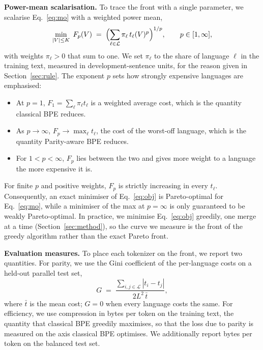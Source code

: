 \noindent\textbf{Power-mean scalarisation.}
To trace the front with a single parameter, we scalarise Eq.~\eqref{eq:mo} with a weighted
power mean,
\begin{equation}
  \min_{|V|\le K}\; F_p(V) \;=\;
  \Bigl(\sum_{\ell\in\mathcal{L}} \pi_\ell\, t_\ell(V)^{p}\Bigr)^{1/p},
  \qquad p\in[1,\infty],
  \label{eq:obj}
\end{equation}
with weights $\pi_\ell>0$ that sum to one. We set $\pi_\ell$ to the share of language $\ell$
in the training text, measured in development-sentence units, for the reason given in
Section~\ref{sec:rule}. The exponent $p$ sets how strongly expensive
languages are emphasised:
\begin{itemize}
  \item At $p=1$, $F_1=\sum_\ell \pi_\ell t_\ell$ is a weighted average cost, which is the
  quantity classical BPE reduces.
  \item As $p\to\infty$, $F_p\to\max_\ell t_\ell$, the cost of the worst-off language,
  which is the quantity Parity-aware BPE reduces.
  \item For $1<p<\infty$, $F_p$ lies between the two and gives more weight to a language
  the more expensive it is.
\end{itemize}
For finite $p$ and positive weights, $F_p$ is strictly increasing in every $t_\ell$.
Consequently, an exact minimiser of Eq.~\eqref{eq:obj} is Pareto-optimal for
Eq.~\eqref{eq:mo}, while a minimiser of the max at $p=\infty$ is only guaranteed to be
weakly Pareto-optimal. In practice, we minimise Eq.~\eqref{eq:obj} greedily, one merge at a
time (Section~\ref{sec:method}), so the curve we measure is the front of the greedy
algorithm rather than the exact Pareto front.

\noindent\textbf{Evaluation measures.}
To place each tokenizer on the front, we report two quantities. For parity, we use the Gini
coefficient of the per-language costs on a held-out parallel test set,
\begin{equation}
  G \;=\; \frac{\sum_{i,j\in\mathcal{L}} |t_i - t_j|}{2L^2\,\bar t},
  \label{eq:gini}
\end{equation}
where $\bar t$ is the mean cost; $G=0$ when every language costs the same. For efficiency,
we use compression in bytes per token on the training text, the quantity that classical BPE
greedily maximises, so that the loss due to parity is measured on the axis classical BPE
optimises. We additionally report bytes per token on the balanced test set.
